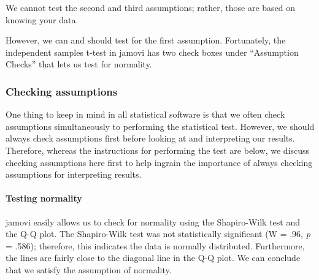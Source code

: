\documentclass[
]{book}
\begin{document}
We cannot test the second and third assumptions; rather, those are based on knowing your data.

However, we can and should test for the first assumption. Fortunately, the independent samples t-test in jamovi has two check boxes under ``Assumption Checks'' that lets us test for normality.

\hypertarget{checking-assumptions-1}{%
\subsubsection{Checking assumptions}\label{checking-assumptions-1}}

One thing to keep in mind in all statistical software is that we often check assumptions simultaneously to performing the statistical test. However, we should always check assumptions first before looking at and interpreting our results. Therefore, whereas the instructions for performing the test are below, we discuss checking assumptions here first to help ingrain the importance of always checking assumptions for interpreting results.

\hypertarget{testing-normality}{%
\paragraph{Testing normality}\label{testing-normality}}

jamovi easily allows us to check for normality using the Shapiro-Wilk test and the Q-Q plot. The Shapiro-Wilk test was not statistically significant (W = .96, \emph{p} = .586); therefore, this indicates the data is normally distributed. Furthermore, the lines are fairly close to the diagonal line in the Q-Q plot. We can conclude that we satisfy the assumption of normality.
\end{document}
